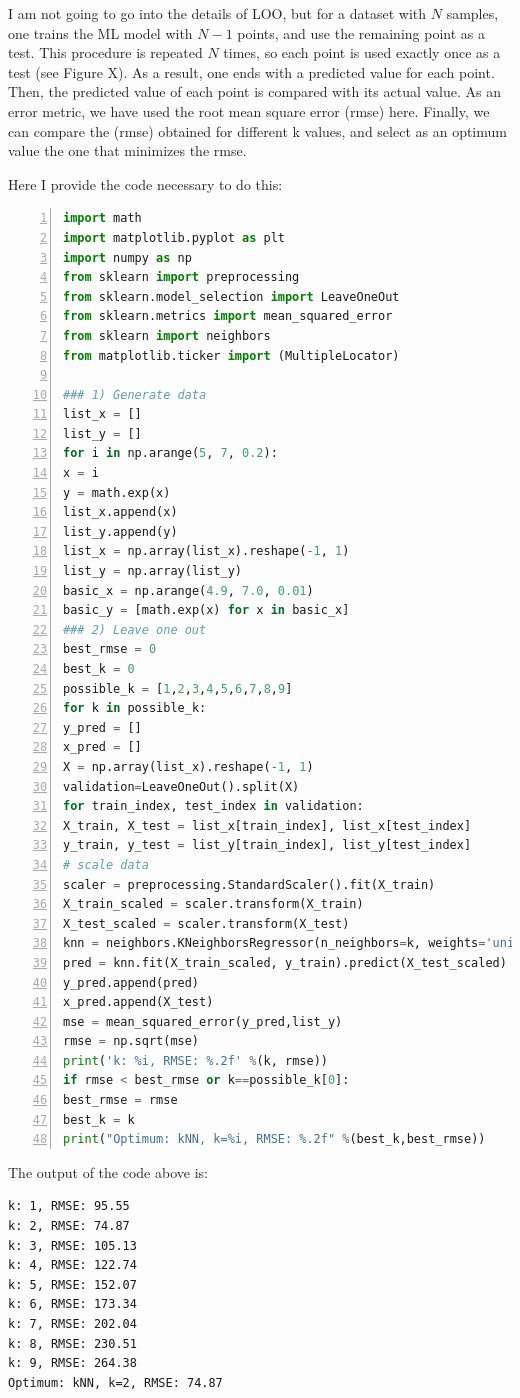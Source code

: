 \documentclass{article}%
\begin{document}
I am not going to go into the details of LOO, but for a dataset with $N$ samples, one trains the ML model with $N-1$ points, and use the remaining point as a test. This procedure is repeated $N$ times, so each point is used exactly once as a test (see Figure X). As a result, one ends with a predicted value for each point. Then, the predicted value of each point is compared with its actual value. As an error metric, we have used the root mean square error (rmse) here. Finally, we can compare the (rmse) obtained for different k values, and select as an optimum value the one that minimizes the rmse.

Here I provide the code necessary to do this:
\begin{lstlisting}[language=Python, caption=Code2,backgroundcolor=\color{lightgrey},keywordstyle=\color{darkgreen},commentstyle=\color{red},
showspaces=false,numbers=left,stringstyle=\color{purple}]
import math
import matplotlib.pyplot as plt 
import numpy as np
from sklearn import preprocessing
from sklearn.model_selection import LeaveOneOut
from sklearn.metrics import mean_squared_error
from sklearn import neighbors
from matplotlib.ticker import (MultipleLocator)

### 1) Generate data
list_x = []
list_y = []
for i in np.arange(5, 7, 0.2):
x = i 
y = math.exp(x)
list_x.append(x)
list_y.append(y)
list_x = np.array(list_x).reshape(-1, 1)
list_y = np.array(list_y)
basic_x = np.arange(4.9, 7.0, 0.01)
basic_y = [math.exp(x) for x in basic_x]
### 2) Leave one out
best_rmse = 0 
best_k = 0 
possible_k = [1,2,3,4,5,6,7,8,9]
for k in possible_k:
y_pred = []
x_pred = []
X = np.array(list_x).reshape(-1, 1)
validation=LeaveOneOut().split(X)
for train_index, test_index in validation:
X_train, X_test = list_x[train_index], list_x[test_index]
y_train, y_test = list_y[train_index], list_y[test_index]
# scale data
scaler = preprocessing.StandardScaler().fit(X_train)
X_train_scaled = scaler.transform(X_train)
X_test_scaled = scaler.transform(X_test)
knn = neighbors.KNeighborsRegressor(n_neighbors=k, weights='uniform')
pred = knn.fit(X_train_scaled, y_train).predict(X_test_scaled)
y_pred.append(pred)
x_pred.append(X_test)
mse = mean_squared_error(y_pred,list_y)
rmse = np.sqrt(mse)
print('k: %i, RMSE: %.2f' %(k, rmse))
if rmse < best_rmse or k==possible_k[0]:
best_rmse = rmse
best_k = k 
print("Optimum: kNN, k=%i, RMSE: %.2f" %(best_k,best_rmse))
\end{lstlisting}

The output of the code above is:
\begin{lstlisting}[backgroundcolor=\color{lightgrey}]
k: 1, RMSE: 95.55
k: 2, RMSE: 74.87
k: 3, RMSE: 105.13
k: 4, RMSE: 122.74
k: 5, RMSE: 152.07
k: 6, RMSE: 173.34
k: 7, RMSE: 202.04
k: 8, RMSE: 230.51
k: 9, RMSE: 264.38
Optimum: kNN, k=2, RMSE: 74.87
\end{lstlisting}
\end{document}
